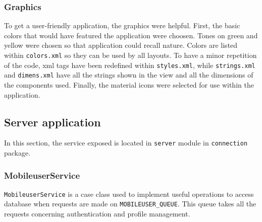 \documentclass[a4paper,12pt]{report}
\begin{document}
\subsubsection{Graphics}
To get a user-friendly application, the graphics were helpful. First, the basic colors that would have featured the application were choosen. Tones on green and yellow were chosen so that application could recall nature. Colors are listed within \texttt{colors.xml} so they can be used by all layouts. To have a minor repetition of the code, xml tags have been redefined within \texttt{styles.xml}, while \texttt{strings.xml} and \texttt{dimens.xml} have all the strings shown in the view and all the dimensions of the components used. Finally, the material icons were selected for use within the application.

\subsection{Server application}
In this section, the service exposed is located in \texttt{server} module in \texttt{connection} package.

\subsubsection{MobileuserService}
\texttt{MobileuserService} is a case class used to implement useful operations to access database when requests are made on \texttt{MOBILEUSER\_QUEUE}. This queue takes all the requests concerning authentication and profile management.
\end{document}
